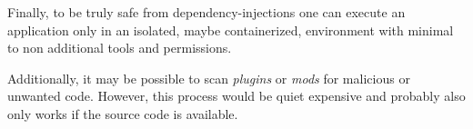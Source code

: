 Finally, to be truly safe from dependency-injections one can execute an application only in an isolated, maybe containerized, environment with minimal to non additional tools and permissions.

Additionally, it may be possible to scan \textit{plugins} or \textit{mods} for malicious or unwanted code.
However, this process would be quiet expensive and probably also only works if the source code is available.